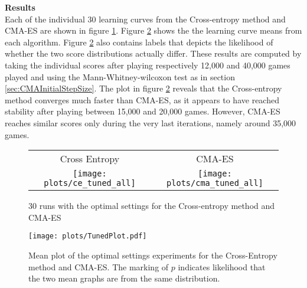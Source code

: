 \textbf{Results}\\
Each of the individual 30 learning curves from the Cross-entropy method
and CMA-ES are shown in figure \ref{fig:tunedAll}. Figure \ref{fig:TunedMean} shows the the
learning curve means from each algorithm. Figure \ref{fig:TunedMean} also contains 
labels that depicts the likelihood of whether the two score distributions actually differ.
These results are computed by taking the individual scores after playing respectively 
12,000 and 40,000 games played and using the Mann-Whitney-wilcoxon test
as in section \ref{sec:CMAInitialStepSize}. The plot in figure \ref{fig:TunedMean}
reveals that the Cross-entropy method converges much faster than CMA-ES, as it 
appears to have reached stability after playing between 15,000 and 20,000 games. However,
CMA-ES reaches similar scores only during the very last iterations, namely around 35,000 games.
\begin{figure}[H]
\begin{tabular}{@{}c@{}c@{}}
Cross Entropy & CMA-ES\\
\texttt{[image: plots/ce\_tuned\_all]} &
\texttt{[image: plots/cma\_tuned\_all]}
\end{tabular}
\caption{30 runs with the optimal settings for the Cross-entropy method and CMA-ES \label{fig:tunedAll}}
\end{figure}

\begin{figure}[H]
\centering
\texttt{[image: plots/TunedPlot.pdf]}
\caption{Mean plot of the optimal settings experiments for the Cross-Entropy method and CMA-ES. 
The marking of $p$ indicates likelihood that the two mean graphs are from the same 
distribution.\label{fig:TunedMean}}
\end{figure}

